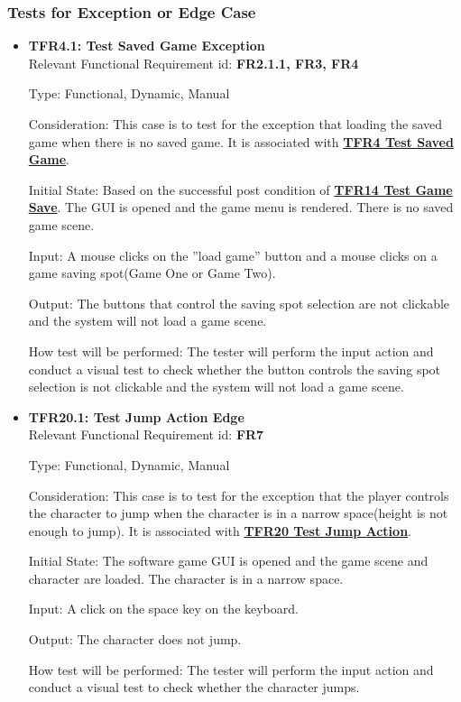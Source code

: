 \documentclass[12pt, titlepage]{article}
\begin{document}
\subsubsection{Tests for Exception or Edge Case}

\begin{itemize}
    \item{\textbf{TFR4.1: Test Saved Game Exception}\\}
Relevant Functional Requirement id: \textbf{FR2.1.1, FR3, FR4}

Type: Functional, Dynamic, Manual

Consideration: This case is to test for the exception that loading the saved game when there is no saved game. It is associated with \hyperref[saved]{\bf TFR4 Test Saved Game}.

Initial State: Based on the successful post condition of \hyperref[save]{\bf TFR14 Test Game Save}. The GUI is opened and the game menu is rendered. There is no saved game scene.

Input: A mouse clicks on the ”load game” button and a mouse clicks on a game saving spot(Game One or Game Two).

Output: The buttons that control the saving spot selection are not clickable and the system will not load a game scene.

How test will be performed: The tester will perform the input action and conduct a visual test to check whether the button controls the saving spot selection is not clickable and the system will not load a game scene.

\item{\textbf{TFR20.1: Test Jump Action Edge}\\}
Relevant Functional Requirement id: \textbf{FR7}

Type: Functional, Dynamic, Manual

Consideration: This case is to test for the exception that the player controls the character to jump when the character is in a narrow space(height is not enough to jump). It is associated with \hyperref[jump]{\bf TFR20 Test Jump Action}.

Initial State: The software game GUI is opened and the game scene and character are loaded. The character is in a narrow space.

Input: A click on the space key on the keyboard.

Output: The character does not jump.

How test will be performed: The tester will perform the input action and conduct a visual test to check whether the character jumps.


\end{itemize}
\end{document}
